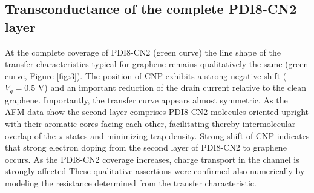 \documentclass[preprint,aip,jap]{revtex4-2}
\begin{document}
\subsection{Transconductance of the complete PDI8-CN2 layer}
\label{sec:complete}

At the complete coverage of PDI8-CN2 (green curve) the line shape of the transfer characteristics typical for graphene remains qualitatively the same (green curve, Figure \ref{fig:3}).
  The position of CNP exhibits a strong negative shift ($V_g=0.5$ V) and an important reduction of the drain current relative to the clean graphene.
 Importantly, the transfer curve appears almost symmetric.
  As the AFM data show the second layer comprises PDI8-CN2 molecules oriented upright with their aromatic cores facing each other, facilitating thereby intermolecular overlap of the $\pi$-states and minimizing trap density.
  Strong shift of CNP indicates that strong electron doping from the second layer of PDI8-CN2 to  graphene occurs.
 As the PDI8-CN2 coverage increases, charge transport in the channel is strongly affected
These qualitative assertions were confirmed also numerically by modeling the resistance determined from the transfer characteristic.
\end{document}
